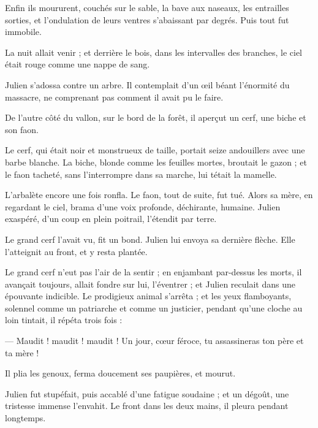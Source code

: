 \documentclass[]{book}
\begin{document}
                Enfin ils moururent, couchés sur le sable, la bave aux naseaux, les entrailles sorties, et l'ondulation de leurs ventres s'abaissant par degrés. Puis tout fut immobile.
                    
                La nuit allait venir ; et derrière le bois, dans les intervalles des branches, le ciel était rouge comme une nappe de sang.
                    
                Julien s'adossa contre un arbre. Il contemplait d'un œil béant l'énormité du massacre, ne comprenant pas comment il avait pu le faire.
                    
                De l'autre côté du vallon, sur le bord de la forêt, il aperçut un cerf, une biche et son faon.
                    
                Le cerf, qui était noir et monstrueux de taille, portait seize andouillers avec une barbe blanche. La biche, blonde comme les feuilles mortes, broutait le gazon ; et le faon tacheté, sans l'interrompre dans sa marche, lui tétait la mamelle.
                    
                L'arbalète encore une fois ronfla. Le faon, tout de suite, fut tué. Alors sa mère, en regardant le ciel, brama d'une voix profonde, déchirante, humaine. Julien exaspéré, d'un coup en plein poitrail, l'étendit par terre.
                    
                Le grand cerf l'avait vu, fit un bond. Julien lui envoya sa dernière flèche. Elle l'atteignit au front, et y resta plantée.
                    
                Le grand cerf n'eut pas l'air de la sentir ; en enjambant par-dessus les morts, il avançait toujours, allait fondre sur lui, l'éventrer ; et Julien reculait dans une épouvante indicible. Le prodigieux animal s'arrêta ; et les yeux flamboyants, solennel comme un patriarche et comme un justicier, pendant qu'une cloche au loin tintait, il répéta trois fois :
                    
                — Maudit ! maudit ! maudit ! Un jour, cœur féroce, tu assassineras ton père et ta mère !
                    
                Il plia les genoux, ferma doucement ses paupières, et mourut.
                    
                Julien fut stupéfait, puis accablé d'une fatigue soudaine ; et un dégoût, une tristesse immense l'envahit. Le front dans les deux mains, il pleura pendant longtemps.
                    
\end{document}
